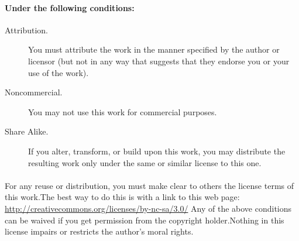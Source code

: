 \begin{appendices}
\paragraph{Under the following conditions:}
\begin{description}
\item[Attribution.]{You must attribute the work in the manner specified by the author or licensor (but not in any way that suggests that they endorse you or your use of the work).}
\item[Noncommercial.]{You may not use this work for commercial purposes.}
\item[Share Alike.]{If you alter, transform, or build upon this work, you may distribute the resulting work only under the same or similar license to this one.}
\end{description}
\paragraph{}For any reuse or distribution, you must make clear to others the license terms of this work.\linebreak The best way to do this is with a link to this web page: \url{http://creativecommons.org/licenses/by-nc-sa/3.0/} \linebreak Any of the above conditions can be waived if you get permission from the copyright holder.\linebreak Nothing in this license impairs or restricts the author's moral rights.

\end{appendices}

